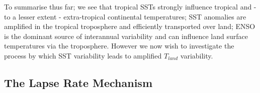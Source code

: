 To summarise thus far; we see that tropical SSTs strongly influence tropical and 
- to a lesser extent - extra-tropical continental temperatures; SST anomalies 
are amplified in the tropical troposphere and efficiently transported over land; 
ENSO is the dominant source of interannual variability and can influence land 
surface temperatures via the troposphere. However we now wish to investigate the 
process by which SST variability leads to amplified $T_{land}$ variability.  



\clearpage

\subsection{The Lapse Rate Mechanism}
\label{mech_lapse}

